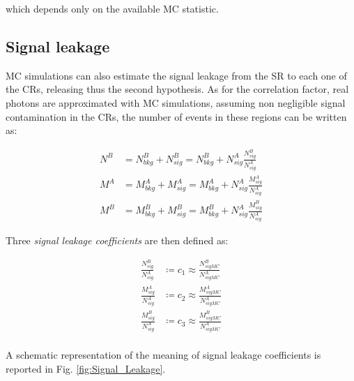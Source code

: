 \documentclass[11pt,a4paper,twoside,openright]{book}
\begin{document}
which depends only on the available MC statistic.

\subsection{Signal leakage}

MC simulations can also estimate the signal leakage from the SR to each one of the CRs, releasing thus the second hypothesis. As for the correlation factor, real photons are approximated with MC simulations, assuming non negligible signal contamination in the CRs, the number of events in these regions can be written as:

\begin{equation}
\begin{aligned}
    N^{B} & = N^{B}_{bkg} + N^{B}_{sig} = N^{B}_{bkg} + N^{A}_{sig} \frac{N^{B}_{sig}}{N^{A}_{sig}} \\
    M^{A} & = M^{A}_{bkg} + M^{A}_{sig} = M^{A}_{bkg} + N^{A}_{sig} \frac{M^{A}_{sig}}{N^{A}_{sig}} \\
    M^{B} & = M^{B}_{bkg} + M^{B}_{sig} = M^{B}_{bkg} + N^{A}_{sig} \frac{M^{B}_{sig}}{N^{A}_{sig}} 
\end{aligned}
\end{equation}

\clearpage
Three \textit{signal leakage coefficients} are then defined as:

\begin{equation}
\begin{aligned}
    \frac{N^{B}_{sig}}{N^{A}_{sig}} & \coloneqq c_{1} \approx \frac{N^{B}_{sigMC}}{N^{A}_{sigMC}} \\
    \frac{M^{A}_{sig}}{N^{A}_{sig}} & \coloneqq c_{2} \approx \frac{M^{A}_{sigMC}}{N^{A}_{sigMC}} \\
    \frac{M^{B}_{sig}}{N^{A}_{sig}} & \coloneqq c_{3} \approx \frac{M^{B}_{sigMC}}{N^{A}_{sigMC}} \\
\end{aligned}
\end{equation}

A schematic representation of the meaning of signal leakage coefficients is reported in Fig. \ref{fig:Signal_Leakage}.
\end{document}
